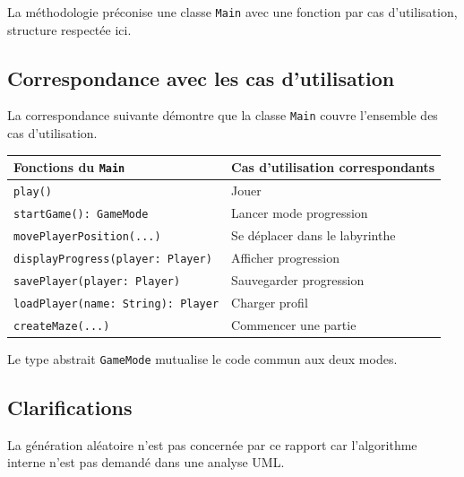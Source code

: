 \documentclass{butexFR}
\begin{document}
La méthodologie préconise une classe \texttt{Main} avec une fonction par cas d'utilisation, structure respectée ici.

\subsection{Correspondance avec les cas d'utilisation}

La correspondance suivante démontre que la classe \texttt{Main} couvre l'ensemble des cas d'utilisation.

\vspace{1em}
\begin{center}
\begin{tabular}{|p{5cm}|p{8cm}|}
\hline
\textbf{Fonctions du \texttt{Main}} & \textbf{Cas d'utilisation correspondants} \\
\hline
\texttt{play()} & Jouer \\
\hline
\texttt{startGame(): GameMode} & Lancer mode progression\\
\hline
\texttt{movePlayerPosition(...)} & Se déplacer dans le labyrinthe \\
\hline
\texttt{displayProgress(player: Player)} & Afficher progression \\
\hline
\texttt{savePlayer(player: Player)} & Sauvegarder progression\\
\hline
\texttt{loadPlayer(name: String): Player} & Charger profil \\
\hline
\texttt{createMaze(...)} & Commencer une partie\\
\hline
\end{tabular}
\end{center}
\vspace{1em}

Le type abstrait \texttt{GameMode} mutualise le code commun aux deux modes.

\subsection{Clarifications}


La génération aléatoire n'est pas concernée par ce rapport car l'algorithme interne n'est pas demandé dans une analyse UML. 


\end{document}
